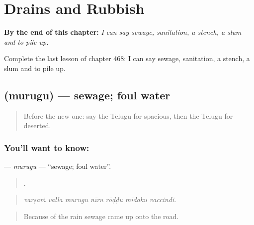 
\chapter{Drains and Rubbish}
\label{ch:te-drains-and-rubbish}

\begin{chapteropening}
\textbf{By the end of this chapter:} \emph{I can say sewage, sanitation, a stench, a slum and to pile up.}

Complete the last lesson of chapter 468: I can say sewage, sanitation, a stench, a slum and to pile up.
\end{chapteropening}

\section[\texorpdfstring{\te{మురుగు} (murugu)}{మురుగు (murugu)}]{ (murugu) — sewage; foul water}

\label{lesson:TE-C468-murugu}



\begin{quote}
Before the new one: say the Telugu for spacious, then the Telugu for deserted.
\end{quote}

\subsection*{You'll want to know: }
\textbf{} — \emph{murugu} — \textquotedblleft{}sewage; foul water\textquotedblright{}.

\begin{quote}
      .
\end{quote}

\begin{quote}
\emph{varṣaṁ valla murugu nīru rōḍḍu mīdaku vaccindi.}
\end{quote}

\begin{quote}
Because of the rain sewage came up onto the road.
\end{quote}

